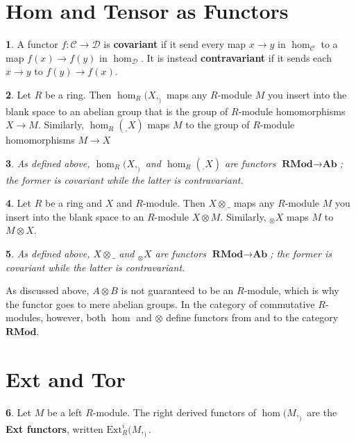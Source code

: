 \documentclass[oneside,english]{amsbook}
\numberwithin{section}{chapter}
\theoremstyle{plain}
\newtheorem{thm}{\protect\theoremname}
\theoremstyle{definition}
\newtheorem{defn}[thm]{\protect\definitionname}
\providecommand{\definitionname}{Definition}
\providecommand{\theoremname}{Theorem}
\begin{document}
		\section{Hom and Tensor as Functors}

			\begin{defn}
				A functor $f:\mathscr{C}\to \mathscr{D}$ is \textbf{covariant} if it send every map $x\to y$ in $\hom_\mathscr{C}$ to a map $f(x)\to f(y)$ in $\hom_\mathscr{D}$. It is instead \textbf{contravariant} if it sends each  $x\to y$ to $f(y)\to f(x)$.
			\end{defn}
			
			\begin{defn}
				Let $R$ be a ring. Then $\hom_R(X, _)$ maps any $R$-module $M$ you insert into the blank space to an abelian group that is the group of $R$-module homomorphisms $X\to M$. Similarly, $\hom_R(_, X)$ maps $M$ to the group of $R$-module homomorphisms $M\to X$
			\end{defn}
			
			\begin{thm}
				As defined above, $\hom_R(X, _)$ and $\hom_R(_, X)$ are functors $\textbf{RMod}\to \textbf{Ab}$; the former is covariant while the latter is contravariant.
			\end{thm}
			
			\begin{defn}
				Let $R$ be a ring and $X$ and $R$-module. Then $X\otimes \_ $ maps any $R$-module $M$ you insert into the blank space to an $R$-module $X\otimes M$. Similarly, $_\otimes X$ maps $M$ to $M\otimes X$.
			\end{defn}
			
			\begin{thm}
				As defined above, $X\otimes \_$ and $_\otimes X$ are functors  $\textbf{RMod}\to \textbf{Ab}$; the former is covariant while the latter is contravariant.
			\end{thm}
			
			As discussed above, $A\otimes B$ is not guaranteed to be an $R$-module, which is why the functor goes to mere abelian groups. In the category of commutative $R$-modules, however, both $\hom$ and $\otimes$ define functors from and to the category $\textbf{RMod}$.
			
	
		\section{Ext and Tor}
		
			\begin{defn}
				Let $M$ be a left $R$-module. The right derived functors of $\hom(M, _)$ are the \textbf{Ext functors}, written $\text{Ext}^i_R(M, _)$.
			\end{defn}
	
\end{document}

